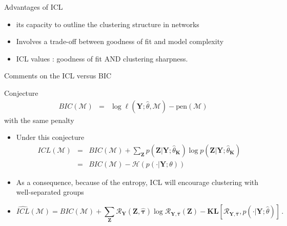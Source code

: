 \documentclass[compress,10pt]{beamer}
\newcommand{\Mcal}{\mathcal{M}}
\newcommand{\bK}{\mathbf{K}}
\newcommand{\Xall}{\mathbf{Y}}
\newcommand{\Zall}{\mathbf{Z}}
\newcommand{\btau}{\mathbf{\tau}}
\newcommand{\bZ}{\mathbf{Z}}
\begin{document}

\begin{frame}{Advantages of ICL}

 
\begin{itemize}
\item its capacity to outline the clustering structure in networks%
\item Involves a trade-off between goodness of fit and model complexity
\item ICL values :   goodness of fit  AND clustering  sharpness.
 
\end{itemize}

\end{frame}

 



 \begin{frame}{Comments on the   ICL versus BIC}

\begin{block}{Conjecture}
\begin{eqnarray*}
 BIC(\Mcal)  &=&  \log \ell(\Xall; \hat{\theta}, \Mcal) - \mbox{pen}(\Mcal)
\end{eqnarray*}
with the same penalty
 \end{block}

\begin{itemize}
\item Under this conjecture
\begin{eqnarray*}
 ICL(\Mcal)  &= & BIC(\Mcal)  +   \sum_{\Zall} p(\bZ | \Xall;\hat \theta_{\bK}) \log p(\bZ | \Xall; \hat \theta_{\bK})\\
 &=& BIC(\Mcal)  -   \mathcal{H}( p(\cdot | \Xall; \theta)) 
\end{eqnarray*}
\item As a consequence, because of the entropy,  ICL  will encourage clustering with well-separated groups 
\item 
$$ 
 \widehat{ICL}(\mathcal{M})  =BIC(\mathcal{M})  +   \sum_{\Zall} \mathcal{R}_{\Xall}(\bZ,\widehat{\btau})  \log \mathcal{R}_{\Xall,\widehat{\btau}}({\bZ}) -  \mathbf{KL}[\mathcal{R}_{\Xall,\widehat{\btau}}, p(\cdot | \Xall;\widehat{\theta})]\,. 
$$

\end{itemize}

 
 \end{frame}
 
\end{document}
